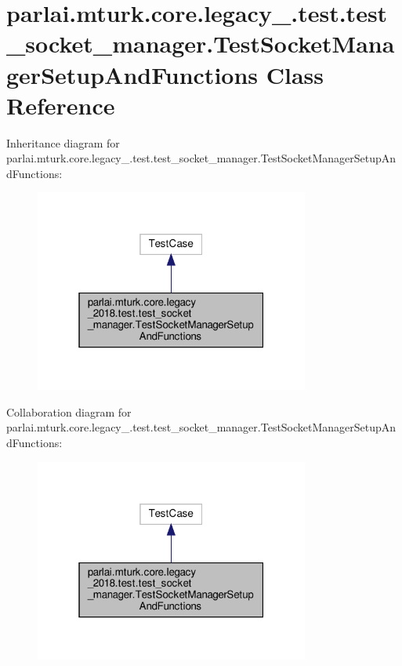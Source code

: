 \hypertarget{classparlai_1_1mturk_1_1core_1_1legacy__2018_1_1test_1_1test__socket__manager_1_1TestSocketManagerSetupAndFunctions}{}\section{parlai.\+mturk.\+core.\+legacy\+\_.\+test.\+test\+\_\+socket\+\_\+manager.\+Test\+Socket\+Manager\+Setup\+And\+Functions Class Reference}
\label{classparlai_1_1mturk_1_1core_1_1legacy__2018_1_1test_1_1test__socket__manager_1_1TestSocketManagerSetupAndFunctions}


Inheritance diagram for parlai.\+mturk.\+core.\+legacy\+\_.\+test.\+test\+\_\+socket\+\_\+manager.\+Test\+Socket\+Manager\+Setup\+And\+Functions\+:
\nopagebreak
\begin{figure}[H]
\begin{center}
\leavevmode
\includegraphics[width=256pt]{db/d7b/classparlai_1_1mturk_1_1core_1_1legacy__2018_1_1test_1_1test__socket__manager_1_1TestSocketManagdc7d4986cee69f28ae406067aaf1776b}
\end{center}
\end{figure}


Collaboration diagram for parlai.\+mturk.\+core.\+legacy\+\_.\+test.\+test\+\_\+socket\+\_\+manager.\+Test\+Socket\+Manager\+Setup\+And\+Functions\+:
\nopagebreak
\begin{figure}[H]
\begin{center}
\leavevmode
\includegraphics[width=256pt]{dc/dd0/classparlai_1_1mturk_1_1core_1_1legacy__2018_1_1test_1_1test__socket__manager_1_1TestSocketManag9ab558bc9a7df0d6e3e8ba6abd77dc1d}
\end{center}
\end{figure}
